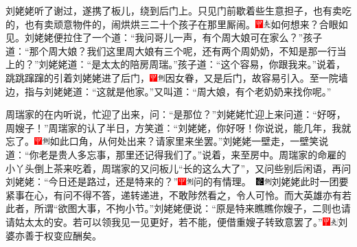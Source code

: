刘姥姥听了谢过，遂携了板儿，绕到后门上。只见门前歇着些生意担子，也有卖吃的，也有卖顽意物件的，闹烘烘三二十个孩子在那里厮闹。{\includegraphics[width=3mm]{../Images/00002}\includegraphics[width=3mm]{../Images/00012}\footnotesize \kaishu 如何想来？合眼如见。}刘姥姥便拉住了一个道：``我问哥儿一声，有个周大娘可在家么？''孩子道：``那个周大娘？我们这里周大娘有三个呢，还有两个周奶奶，不知是那一行当上的？''刘姥姥道：``是太太的陪房周瑞。''孩子道：``这个容易，你跟我来。''说着，跳跳蹿蹿的引着刘姥姥进了后门，{\includegraphics[width=3mm]{../Images/00002}\includegraphics[width=3mm]{../Images/00011}\footnotesize \kaishu 因女眷，又是后门，故容易引入。}至一院墙边，指与刘姥姥道：``这就是他家。''又叫道：``周大娘，有个老奶奶来找你呢。''

周瑞家的在内听说，忙迎了出来，问：``是那位？''刘姥姥忙迎上来问道：``好呀，周嫂子！''周瑞家的认了半日，方笑道：``刘姥姥，你好呀！你说说，能几年，我就忘了。{\includegraphics[width=3mm]{../Images/00002}\includegraphics[width=3mm]{../Images/00011}\footnotesize \kaishu 如此口角，从何处出来？}请家里来坐罢。''刘姥姥一壁走，一壁笑说道：``你老是贵人多忘事，那里还记得我们了。''说着，来至房中。周瑞家的命雇的小丫头倒上茶来吃着，周瑞家的又问板儿``长的这么大了''，又问些别后闲语，再问刘姥姥：``今日还是路过，还是特来的？''{{\includegraphics[width=3mm]{../Images/00002}\includegraphics[width=3mm]{../Images/00011}\footnotesize \kaishu 问的有情理。　}\includegraphics[width=3mm]{../Images/00006}\includegraphics[width=3mm]{../Images/00011}\footnotesize \kaishu 刘姥姥此时一团要紧事在心，有问不得不答，递转递进，不敢陟然看之，令人可怜。而大英雄亦有若此者，所谓``欲图大事，不拘小节。''}刘姥姥便说：``原是特来瞧瞧你嫂子，二则也请请姑太太的安。若可以领我见一见更好，若不能，便借重嫂子转致意罢了。''{\includegraphics[width=3mm]{../Images/00002}\includegraphics[width=3mm]{../Images/00012}\footnotesize \kaishu 刘婆亦善于权变应酬矣。}

